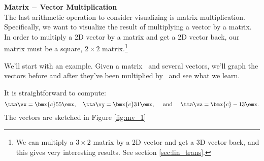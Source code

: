 \smallskip


\noindent \large \textsf{\textbf{Matrix $-$ Vector Multiplication}} \normalsize\\

The last arithmetic operation to consider visualizing is matrix multiplication. Specifically, we want to visualize the result of multiplying a vector by a matrix. In order to multiply a 2D vector by a matrix and get a 2D vector back, our matrix must be a square, $2\times 2$ matrix.\footnote{We can multiply a $3\times 2$ matrix by a 2D vector and get a 3D vector back, and this gives very interesting results. See section \ref{sec:lin_trans}.}

We'll start with an example. Given a matrix \tta\ and several vectors, we'll graph the vectors before and after they've been multiplied by \tta\ and see what we learn.

\medskip

{\begin{myfigure}%
\begin{center}
\end{center}
\label{fig:mv_1}
\end{myfigure}%

It is straightforward to compute: 
\[
\tta\vx = \bmx{c} 5\\5\emx,\quad \tta\vy = \bmx{c} 3\\1\emx, \quad \text{ and } \quad \tta\vz = \bmx{c} -1\\3\emx.
\]
The vectors are sketched in Figure \ref{fig:mv_1}
}

